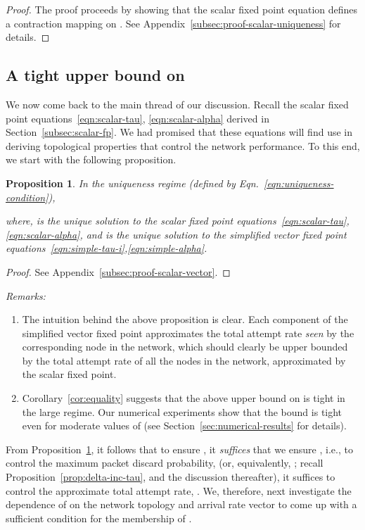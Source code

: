 \documentclass[12pt, draftclsnofoot, onecolumn]{IEEEtran}
\newcommand{\gap}{\vspace{2mm}}
\newtheorem{proposition}{Proposition}
\begin{document}
\begin{proof}
The proof proceeds by showing that the scalar fixed point equation defines a contraction mapping on . See Appendix~\ref{subsec:proof-scalar-uniqueness} for details.  
\end{proof}

\subsection{A tight upper bound on }
We now come back to the main thread of our discussion. Recall the scalar fixed point equations~\eqref{eqn:scalar-tau}, \eqref{eqn:scalar-alpha} derived in Section~\ref{subsec:scalar-fp}. We had promised that these equations will find use in deriving topological properties that control the network performance. To this end, we start with the following proposition.

\begin{proposition}
\label{prop:scalar-vector-fp-relation}
In the uniqueness regime (defined by Eqn.~\ref{eqn:uniqueness-condition}), 

where,  is the unique solution to the scalar fixed point equations~\eqref{eqn:scalar-tau},\eqref{eqn:scalar-alpha}, and  is the unique solution to the simplified vector fixed point equations~\eqref{eqn:simple-tau-i},\eqref{eqn:simple-alpha}.
\end{proposition} 

\begin{proof}
See Appendix~\ref{subsec:proof-scalar-vector}.
\end{proof}

\gap
\noindent
\emph{Remarks:}

\begin{enumerate}
\item The intuition behind the above proposition is clear. Each component of the simplified vector fixed point approximates the total attempt rate \emph{seen} by the corresponding node in the network, which should clearly be upper bounded by the total attempt rate of all the nodes in the network, approximated by the scalar fixed point. 
\item Corollary~\ref{cor:equality} suggests that the above upper bound on  is tight in the large  regime. Our numerical experiments show that the bound is tight even for moderate values of  (see Section~\ref{sec:numerical-results} for details). 
\end{enumerate}

From Proposition~\ref{prop:scalar-vector-fp-relation}, it follows that to ensure , it \emph{suffices} that we ensure , i.e., to control the maximum packet discard probability,  (or, equivalently, ; recall Proposition~\ref{prop:delta-inc-tau}, and the discussion thereafter), it suffices to control the approximate total attempt rate, . We, therefore, next investigate the dependence of  on the network topology and arrival rate vector to come up with a sufficient condition for the membership of .
\end{document}
